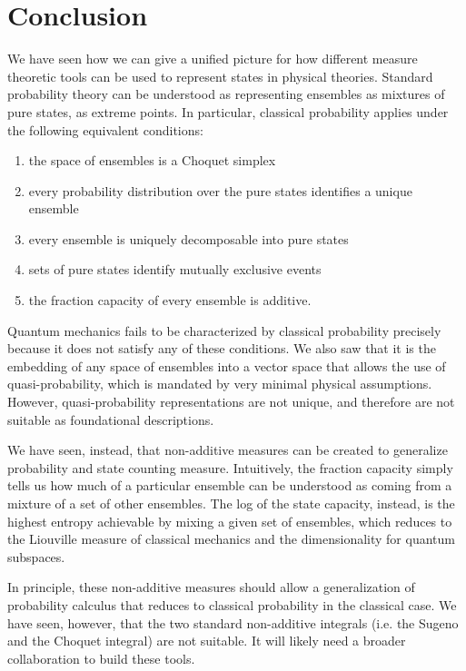 \documentclass[10pt,twocolumn, nofootinbib]{revtex4-2}
\begin{document}
\section{Conclusion}

We have seen how we can give a unified picture for how different measure theoretic tools can be used to represent states in physical theories. Standard probability theory can be understood as representing ensembles as mixtures of pure states, as extreme points. In particular, classical probability applies under the following equivalent conditions:
\begin{enumerate}
	\item the space of ensembles is a Choquet simplex
	\item every probability distribution over the pure states identifies a unique ensemble
	\item every ensemble is uniquely decomposable into pure states
	\item sets of pure states identify mutually exclusive events
	\item the fraction capacity of every ensemble is additive.
\end{enumerate}
Quantum mechanics fails to be characterized by classical probability precisely because it does not satisfy any of these conditions. We also saw that it is the embedding of any space of ensembles into a vector space that allows the use of quasi-probability, which is mandated by very minimal physical assumptions. However, quasi-probability representations are not unique, and therefore are not suitable as foundational descriptions.

We have seen, instead, that non-additive measures can be created to generalize probability and state counting measure. Intuitively, the fraction capacity simply tells us how much of a particular ensemble can be understood as coming from a mixture of a set of other ensembles. The log of the state capacity, instead, is the highest entropy achievable by mixing a given set of ensembles, which reduces to the Liouville measure of classical mechanics and the dimensionality for quantum subspaces.

In principle, these non-additive measures should allow a generalization of probability calculus that reduces to classical probability in the classical case. We have seen, however, that the two standard non-additive integrals (i.e. the Sugeno and the Choquet integral) are not suitable. It will likely need a broader collaboration to build these tools.
\end{document}
